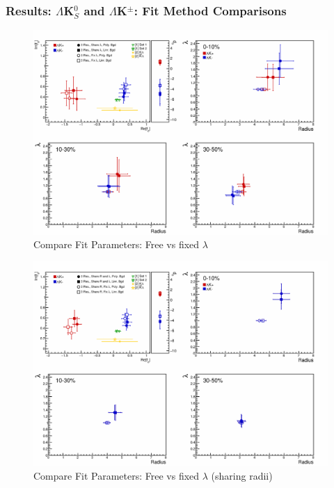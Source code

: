 \documentclass[../AnalysisNoteJBuxton.tex]{subfiles}
\begin{document}
\subsubsection{Results: \texorpdfstring{$\Lambda$K$^{0}_{S}$ and $\Lambda$K$^{\pm}$: Fit Method Comparisons}{TEXT}}
\label{ResultsLamK_FitMethComp}


\begin{figure}[h]
  \centering
  \includegraphics[width=\textwidth]{7_ResultsAndDiscussion/Figures/CompareAllScattParams_FreevsFixlam_SepR_NoStav.pdf}
  \caption[Compare Fit Parameters: Free vs fixed $\lambda$]{Compare Fit Parameters: Free vs fixed $\lambda$}
  \label{fig:CompareAllScattParams_FreevsFixlam_SepR_NoStav}
\end{figure}

\begin{figure}[h]
  \centering
  \includegraphics[width=\textwidth]{7_ResultsAndDiscussion/Figures/CompareAllScattParams_FreevsFixlam_ShareR_NoStav.pdf}
  \caption[Compare Fit Parameters: Free vs fixed $\lambda$ (sharing radii)]{Compare Fit Parameters: Free vs fixed $\lambda$ (sharing radii)}
  \label{fig:CompareAllScattParams_FreevsFixlam_ShareR_NoStav}
\end{figure}
\end{document}
